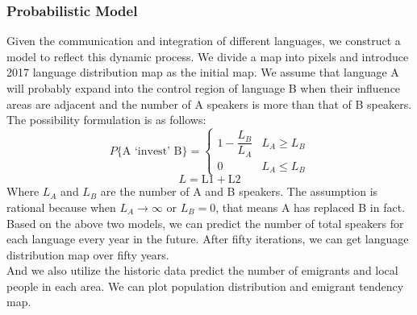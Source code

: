 \documentclass{mcmthesis}
\begin{document}
\subsubsection{Probabilistic Model}
Given the communication and integration of different languages, we construct a model to reflect this dynamic process. We divide a map into pixels and introduce 2017 language distribution map as the initial map. We assume that language A will probably expand into the control region of language B when their influence areas are adjacent and the number of A speakers is more than that of B speakers. The possibility formulation is as follows:
\[P\{\textrm{A `invest' B}\}=\left\{
\begin{array}{lc}
1-\dfrac{L_B}{L_A}&L_A\geqslant L_B\\
0&L_A\leqslant L_B
\end{array}\right. \]
\[L=\textrm{L1}+\textrm{L2}\]
Where \(L_A\) and \(L_B\) are the number of A and B speakers. The assumption is rational because when \(L_A \rightarrow\infty\) or \(L_B=0\), that means A has replaced B in fact.\\
\indent Based on the above two models, we can predict the number of total speakers for each language every year in the future. After fifty iterations, we can get language distribution map over fifty years.\\
\indent And we also utilize the historic data predict the number of emigrants and local people in each area. We can plot population distribution and emigrant tendency map.
\end{document}
